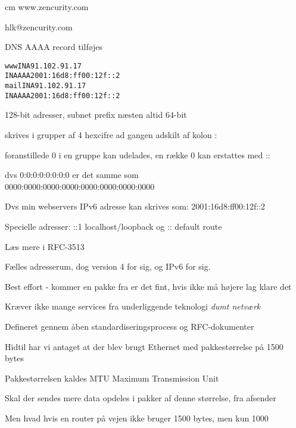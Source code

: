 \documentclass[Screen16to9,17pt]{foils}
\begin{document}
\begin{center}
 cm
www.zencurity.com

hlk@zencurity.com

\end{center}

\pause
DNS AAAA record tilføjes

\begin{alltt}
www     IN A    91.102.91.17
        IN AAAA 2001:16d8:ff00:12f::2
mail    IN A    91.102.91.17
        IN AAAA 2001:16d8:ff00:12f::2
\end{alltt}



\begin{list2}
\item 128-bit adresser, subnet prefix næsten altid 64-bit
\item skrives i grupper af 4 hexcifre ad gangen adskilt af kolon :
\item foranstillede 0 i en gruppe kan udelades, en række 0 kan erstattes med ::
\item dvs 0:0:0:0:0:0:0:0 er det samme som \\
0000:0000:0000:0000:0000:0000:0000:0000
\item Dvs min webservers IPv6 adresse kan skrives som:
2001:16d8:ff00:12f::2
\item Specielle adresser:
::1 localhost/loopback og
::  default route
\item Læs mere i RFC-3513
\end{list2}



\begin{list1}
\item Fælles adresserum, dog version 4 for sig, og IPv6 for sig.
\item Best effort - kommer en pakke fra er det fint, hvis ikke må højere lag klare det
\item Kræver ikke mange services fra underliggende teknologi \emph{dumt netværk}
\item Defineret gennem åben standardiseringsprocess og RFC-dokumenter
\end{list1}


\begin{list1}
\item Hidtil har vi antaget at der blev brugt Ethernet med pakkestørrelse på 1500 bytes
\item Pakkestørrelsen kaldes MTU Maximum Transmission Unit
\item Skal der sendes mere data opdeles i pakker af denne størrelse, fra afsender
\item Men hvad hvis en router på vejen ikke bruger 1500 bytes, men kun 1000
\end{list1}
\end{document}
